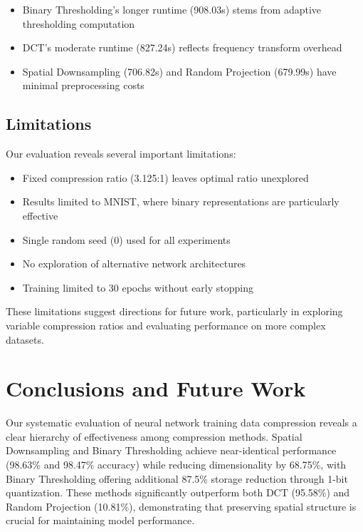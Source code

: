 \documentclass{article} %
\begin{document}
\begin{itemize}
    \item Binary Thresholding's longer runtime (908.03s) stems from adaptive thresholding computation
    \item DCT's moderate runtime (827.24s) reflects frequency transform overhead
    \item Spatial Downsampling (706.82s) and Random Projection (679.99s) have minimal preprocessing costs
\end{itemize}

\subsection{Limitations}
Our evaluation reveals several important limitations:

\begin{itemize}
    \item Fixed compression ratio (3.125:1) leaves optimal ratio unexplored
    \item Results limited to MNIST, where binary representations are particularly effective
    \item Single random seed (0) used for all experiments
    \item No exploration of alternative network architectures
    \item Training limited to 30 epochs without early stopping
\end{itemize}

These limitations suggest directions for future work, particularly in exploring variable compression ratios and evaluating performance on more complex datasets.

\section{Conclusions and Future Work}
\label{sec:conclusion}

Our systematic evaluation of neural network training data compression reveals a clear hierarchy of effectiveness among compression methods. Spatial Downsampling and Binary Thresholding achieve near-identical performance (98.63\% and 98.47\% accuracy) while reducing dimensionality by 68.75\%, with Binary Thresholding offering additional 87.5\% storage reduction through 1-bit quantization. These methods significantly outperform both DCT (95.58\%) and Random Projection (10.81\%), demonstrating that preserving spatial structure is crucial for maintaining model performance.
\end{document}

